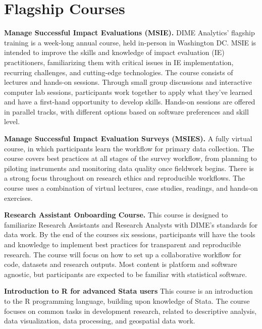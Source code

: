 \section{Flagship Courses}

\textbf{Manage Successful Impact Evaluations (MSIE).}
DIME Analytics’ flagship training is a week-long annual course,
held in-person in Washington DC.
MSIE is intended to improve the skills and knowledge of
impact evaluation (IE) practitioners,
familiarizing them with critical issues in
IE implementation, recurring challenges,
and cutting-edge technologies.
The course consists of lectures and hands-on sessions.
Through small group discussions and interactive computer lab sessions,
participants work together to apply what they’ve learned
and have a first-hand opportunity to develop skills.
Hands-on sessions are offered in parallel tracks,
with different options based on software preferences and skill level.

\resourcepar\textbf{Manage Successful Impact Evaluation Surveys (MSIES).}
A fully virtual course,
in which participants learn the workflow for primary data collection.
The course covers best practices at all stages of the survey workflow,
from planning to piloting instruments
and monitoring data quality once fieldwork begins.
There is a strong focus throughout on research ethics and reproducible workflows.
The course uses a combination of virtual lectures,
case studies, readings, and hands-on exercises.

\resourcepar\textbf{Research Assistant Onboarding Course.}
This course is designed to familiarize Research Assistants and Research Analysts
with DIME’s standards for data work.
By the end of the courses six sessions,
participants will have the tools and knowledge to
implement best practices for transparent and reproducible research.
The course will focus on how to set up a collaborative workflow for
code, datasets and research outputs.
Most content is platform and software agnostic,
but participants are expected to be familiar with statistical software.

\resourcepar\textbf{Introduction to R for advanced Stata users}
This course is an introduction to the R programming language,
building upon knowledge of Stata.
The course focuses on common tasks in
development research, related to descriptive analysis,
data visualization, data processing, and geospatial data work.

